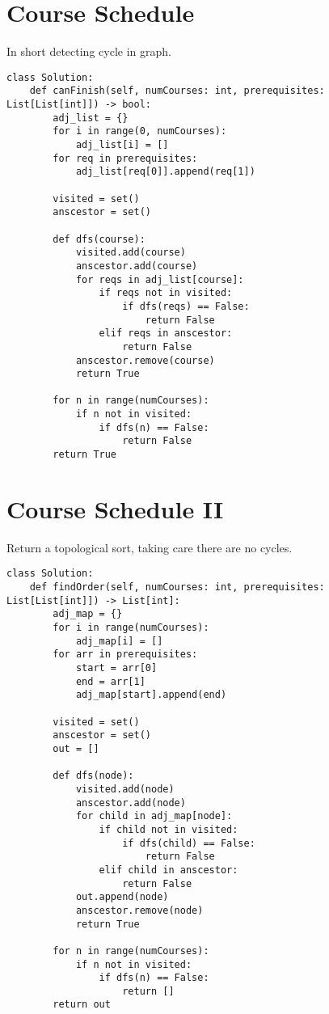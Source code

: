 \documentclass[24pt, a4]{article}
\begin{document}
\section{Course Schedule}
In short detecting cycle in graph.
\begin{lstlisting}
class Solution:
    def canFinish(self, numCourses: int, prerequisites: List[List[int]]) -> bool:
        adj_list = {}
        for i in range(0, numCourses):
            adj_list[i] = []
        for req in prerequisites:
            adj_list[req[0]].append(req[1])

        visited = set()
        anscestor = set()

        def dfs(course):
            visited.add(course)
            anscestor.add(course)
            for reqs in adj_list[course]:
                if reqs not in visited:
                    if dfs(reqs) == False:
                        return False
                elif reqs in anscestor:
                    return False
            anscestor.remove(course)
            return True

        for n in range(numCourses):
            if n not in visited:
                if dfs(n) == False:
                    return False
        return True
\end{lstlisting}
\newpage
\section{Course Schedule II}
Return a topological sort, taking care there are no cycles.
\begin{lstlisting}
class Solution:
    def findOrder(self, numCourses: int, prerequisites: List[List[int]]) -> List[int]:
        adj_map = {}
        for i in range(numCourses):
            adj_map[i] = []
        for arr in prerequisites:
            start = arr[0]
            end = arr[1]
            adj_map[start].append(end)
        
        visited = set()
        anscestor = set()
        out = []

        def dfs(node):
            visited.add(node)
            anscestor.add(node)
            for child in adj_map[node]:
                if child not in visited:
                    if dfs(child) == False:
                        return False
                elif child in anscestor:
                    return False
            out.append(node)
            anscestor.remove(node)
            return True

        for n in range(numCourses):
            if n not in visited:
                if dfs(n) == False:
                    return []
        return out
\end{lstlisting}
\newpage
\end{document}
